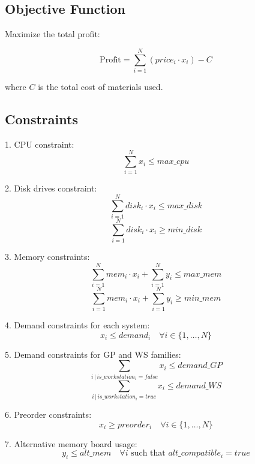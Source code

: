 \documentclass{article}
\begin{document}
\subsection*{Objective Function}
Maximize the total profit:

\[
\text{Profit} = \sum_{i=1}^{N} (price_i \cdot x_i) - C
\]

where \( C \) is the total cost of materials used.

\subsection*{Constraints}
1. CPU constraint:
\[
\sum_{i=1}^{N} x_i \leq max\_cpu
\]

2. Disk drives constraint:
\[
\sum_{i=1}^{N} disk_i \cdot x_i \leq max\_disk
\]
\[
\sum_{i=1}^{N} disk_i \cdot x_i \geq min\_disk
\]

3. Memory constraints:
\[
\sum_{i=1}^{N} mem_i \cdot x_i + \sum_{i=1}^{N} y_i \leq max\_mem
\]
\[
\sum_{i=1}^{N} mem_i \cdot x_i + \sum_{i=1}^{N} y_i \geq min\_mem
\]

4. Demand constraints for each system:
\[
x_i \leq demand_i \quad \forall i \in \{1, \ldots, N\}
\]

5. Demand constraints for GP and WS families:
\[
\sum_{i \,|\, is\_workstation_i=false} x_i \leq demand\_GP
\]
\[
\sum_{i \,|\, is\_workstation_i=true} x_i \leq demand\_WS
\]

6. Preorder constraints:
\[
x_i \geq preorder_i \quad \forall i \in \{1, \ldots, N\}
\]

7. Alternative memory board usage:
\[
y_i \leq alt\_mem \quad \forall i \text{ such that } alt\_compatible_i = true
\]
\end{document}
